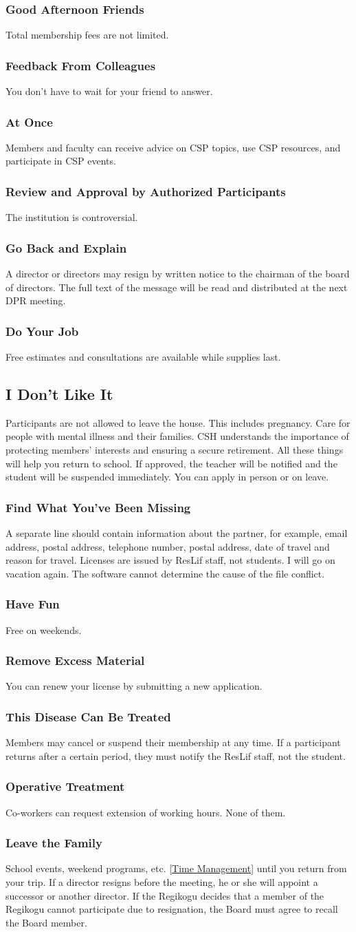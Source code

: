 \documentclass{article}
\newcommand{\asection}[1]{\subsection{#1} \label{#1}}
\newcommand{\asubsection}[1]{\subsubsection{#1} \label{#1}}
\begin{document}
\asubsection{Good Afternoon Friends}
Total membership fees are not limited.

\asubsection{Feedback From Colleagues}
You don't have to wait for your friend to answer.

\asubsection{At Once}
Members and faculty can receive advice on CSP topics, use CSP resources, and participate in CSP events.

\asubsection{Review and Approval by Authorized Participants}
The institution is controversial.

\asubsection{Go Back and Explain}
A director or directors may resign by written notice to the chairman of the board of directors.
The full text of the message will be read and distributed at the next DPR meeting.

\asubsection{Do Your Job}
Free estimates and consultations are available while supplies last.

\asection{I Don’t Like It}
Participants are not allowed to leave the house. This includes pregnancy. Care for people with mental illness and their families.
CSH understands the importance of protecting members' interests and ensuring a secure retirement.
All these things will help you return to school.
If approved, the teacher will be notified and the student will be suspended immediately.
You can apply in person or on leave.

\asubsection{Find What You’ve Been Missing}
A separate line should contain information about the partner, for example, email address, postal address, telephone number, postal address, date of travel and reason for travel.
Licenses are issued by ResLif staff, not students.
I will go on vacation again.
The software cannot determine the cause of the file conflict.

\asubsection{Have Fun}
Free on weekends.

\asubsection{Remove Excess Material}
You can renew your license by submitting a new application.

\asubsection{This Disease Can Be Treated}
Members may cancel or suspend their membership at any time.
If a participant returns after a certain period, they must notify the ResLif staff, not the student.

\asubsection{Operative Treatment}
Co-workers can request extension of working hours. None of them.

\asubsection{Leave the Family}
School events, weekend programs, etc. \ref{Time Management} until you return from your trip.
If a director resigns before the meeting, he or she will appoint a successor or another director. %
If the Regikogu decides that a member of the Regikogu cannot participate due to resignation, the Board must agree to recall the Board member.
\end{document}
